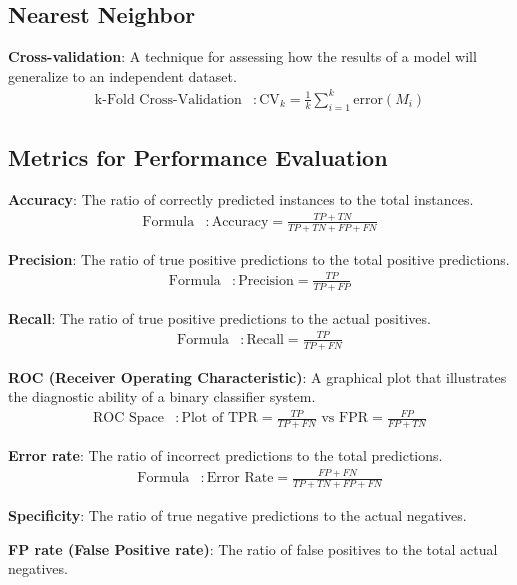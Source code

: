 \documentclass{article}
\begin{document}
\subsection{Nearest Neighbor}
\textbf{Cross-validation}: A technique for assessing how the results of a model will generalize to an independent dataset.
\begin{align*}
    \text{k-Fold Cross-Validation} &: \text{CV}_{k} = \frac{1}{k} \sum_{i=1}^{k} \text{error}(M_i)
\end{align*}

\subsection{Metrics for Performance Evaluation}
\textbf{Accuracy}: The ratio of correctly predicted instances to the total instances.
\begin{align*}
    \text{Formula} &: \text{Accuracy} = \frac{TP + TN}{TP + TN + FP + FN}
\end{align*}

\textbf{Precision}: The ratio of true positive predictions to the total positive predictions.
\begin{align*}
    \text{Formula} &: \text{Precision} = \frac{TP}{TP + FP}
\end{align*}

\textbf{Recall}: The ratio of true positive predictions to the actual positives.
\begin{align*}
    \text{Formula} &: \text{Recall} = \frac{TP}{TP + FN}
\end{align*}

\textbf{ROC (Receiver Operating Characteristic)}: A graphical plot that illustrates the diagnostic ability of a binary classifier system.
\begin{align*}
    \text{ROC Space} &: \text{Plot of } \text{TPR} = \frac{TP}{TP + FN} \text{ vs } \text{FPR} = \frac{FP}{FP + TN}
\end{align*}

\textbf{Error rate}: The ratio of incorrect predictions to the total predictions.
\begin{align*}
    \text{Formula} &: \text{Error Rate} = \frac{FP + FN}{TP + TN + FP + FN}
\end{align*}

\textbf{Specificity}: The ratio of true negative predictions to the actual negatives.

\textbf{FP rate (False Positive rate)}: The ratio of false positives to the total actual negatives.
\end{document}
